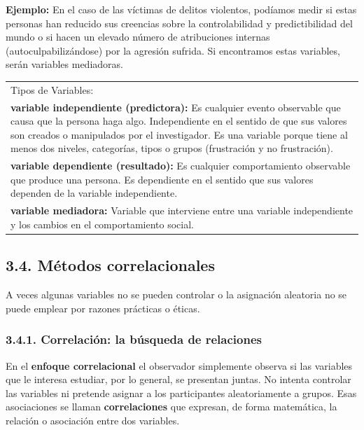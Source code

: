 \documentclass[
]{website}
\begin{document}
\textbf{Ejemplo:} En el caso de las víctimas de delitos violentos, podíamos medir si estas personas han reducido sus creencias sobre la controlabilidad y predictibilidad del mundo o si hacen un elevado número de atribuciones internas (autoculpabilizándose) por la agresión sufrida. Si encontramos estas variables, serán variables mediadoras.

\begin{longtable}[]{@{}
  >{\raggedright\arraybackslash}p{}@{}}
\toprule\noalign{}
\endhead
\bottomrule\noalign{}
\endlastfoot
Tipos de Variables: \\
\textbf{variable independiente (predictora):}
Es cualquier evento observable que causa que la persona haga algo. Independiente en el sentido de que sus valores son creados o manipulados por el investigador. Es una variable porque tiene al menos dos niveles, categorías, tipos o grupos (frustración y no frustración). \\
\textbf{variable dependiente (resultado):}
Es cualquier comportamiento observable que produce una persona. Es dependiente en el sentido que sus valores dependen de la variable independiente. \\
\textbf{variable mediadora:}
Variable que interviene entre una variable independiente y los cambios en el comportamiento social. \\
\end{longtable}

\subsection*{3.4. Métodos correlacionales}\label{subtema3_4}

A veces algunas variables no se pueden controlar o la asignación aleatoria no se puede emplear por razones prácticas o éticas.

\subsubsection*{3.4.1. Correlación: la búsqueda de relaciones}\label{subtema3_4_1}

En el \textbf{enfoque correlacional} el observador simplemente observa si las variables que le interesa estudiar, por lo general, se presentan juntas. No intenta controlar las variables ni pretende asignar a los participantes aleatoriamente a grupos. Esas asociaciones se llaman \textbf{correlaciones} que expresan, de forma matemática, la relación o asociación entre dos variables.
\end{document}

